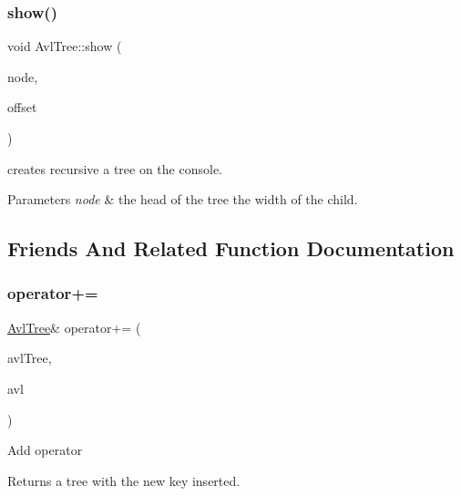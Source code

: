 \subsubsection{\texorpdfstring{show()}{show()}\hspace{0.1cm}{\footnotesize\ttfamily [2/2]}}
{\footnotesize\ttfamily void Avl\+Tree\+::show (\begin{DoxyParamCaption}\item[{Avl\+Tree\+::\+Node $\ast$}]{node,  }\item[{int}]{offset }\end{DoxyParamCaption})}



creates recursive a tree on the console. 


\begin{DoxyParams}{Parameters}
{\em node} & the head of the tree  the width of the child. \\
\hline
\end{DoxyParams}


\subsection{Friends And Related Function Documentation}
\mbox{\label{class_avl_tree_a7e8543fa39fcd41bf8738b1384658b3f}} 
\subsubsection{\texorpdfstring{operator+=}{operator+=}}
{\footnotesize\ttfamily \mbox{\hyperlink{class_avl_tree}{Avl\+Tree}}\& operator+= (\begin{DoxyParamCaption}\item[{\mbox{\hyperlink{class_avl_tree}{Avl\+Tree}} \&}]{avl\+Tree,  }\item[{int const}]{avl }\end{DoxyParamCaption})\hspace{0.3cm}{\ttfamily [friend]}}

Add operator \begin{DoxyReturn}{Returns}
a tree with the new key inserted. 
\end{DoxyReturn}
\mbox{\label{class_avl_tree_aebcb43fe34dc651b0907a6cdeca29946}} 
